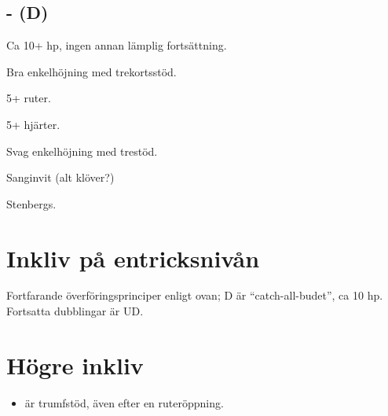 \subsection{ - (D)}
\bbe
\item[RD] Ca 10+ hp, ingen annan lämplig fortsättning.
\item[\NT{1}] Bra enkelhöjning med trekortsstöd.
\item[\kl{2}] 5+ ruter.
\item[\ru{2}] 5+ hjärter.
\item[\hj{2}] Svag enkelhöjning med trestöd.
\item[\spa{2}] Sanginvit (alt klöver?)
\item[\NT{2}] Stenbergs.
\ebe 


\section{Inkliv på entricksnivån}

Fortfarande överföringsprinciper enligt ovan; D är ``catch-all-budet'', ca
10 hp. Fortsatta dubblingar är UD.

\section{Högre inkliv}

\begin{itemize}

\item {} är trumfstöd, även efter en ruteröppning.


\end{itemize}






